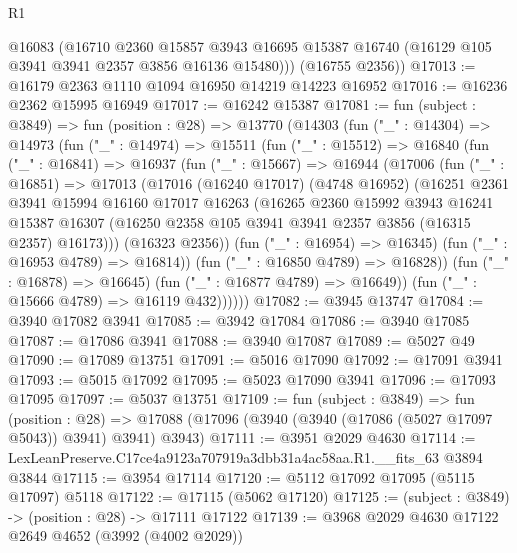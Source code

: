 \begin{lexlean}{R1}
\begin{coremodule}
        @16083
        (@16710
          @2360
          @15857
          @3943
          @16695
          @15387
          @16740
          (@16129 @105 @3941 @3941 @2357 @3856 @16136 @15480)))
      (@16755 @2356))
@17013 := @16179 @2363 @1110 @1094 @16950 @14219 @14223 @16952
@17016 := @16236 @2362 @15995 @16949
@17017 := @16242 @15387
@17081 := fun (subject : @3849) =>
  fun (position : @28) =>
  @13770
    (@14303
      (fun ("_" : @14304) =>
      @14973
        (fun ("_" : @14974) =>
        @15511
          (fun ("_" : @15512) =>
          @16840
            (fun ("_" : @16841) =>
            @16937
              (fun ("_" : @15667) =>
              @16944
                (@17006
                  (fun ("_" : @16851) =>
                  @17013
                    (@17016
                      (@16240 @17017)
                      (@4748 @16952)
                      (@16251
                        @2361
                        @3941
                        @15994
                        @16160
                        @17017
                        @16263
                        (@16265
                          @2360
                          @15992
                          @3943
                          @16241
                          @15387
                          @16307
                          (@16250 @2358 @105 @3941 @3941 @2357 @3856 (@16315 @2357) @16173)))
                      (@16323 @2356))
                    (fun ("_" : @16954) => @16345)
                    (fun ("_" : @16953 @4789) => @16814))
                  (fun ("_" : @16850 @4789) => @16828))
                (fun ("_" : @16878) => @16645)
                (fun ("_" : @16877 @4789) => @16649))
              (fun ("_" : @15666 @4789) => @16119 @432))))))
@17082 := @3945 @13747
@17084 := @3940 @17082 @3941
@17085 := @3942 @17084
@17086 := @3940 @17085
@17087 := @17086 @3941
@17088 := @3940 @17087
@17089 := @5027 @49
@17090 := @17089 @13751
@17091 := @5016 @17090
@17092 := @17091 @3941
@17093 := @5015 @17092
@17095 := @5023 @17090 @3941
@17096 := @17093 @17095
@17097 := @5037 @13751
@17109 := fun (subject : @3849) =>
  fun (position : @28) =>
  @17088 (@17096 (@3940 (@3940 (@17086 (@5027 @17097 @5043)) @3941) @3941) @3943)
@17111 := @3951 @2029 @4630
@17114 := LexLeanPreserve.C17ce4a9123a707919a3dbb31a4ac58aa.R1.__fits_63 @3894 @3844
@17115 := @3954 @17114
@17120 := @5112 @17092 @17095 (@5115 @17097) @5118
@17122 := @17115 (@5062 @17120)
@17125 := (subject : @3849) -> (position : @28) -> @17111 @17122
@17139 := @3968
    @2029
    @4630
    @17122
    @2649
    @4652
    (@3992 (@4002 @2029))

\end{coremodule}
\end{lexlean}
